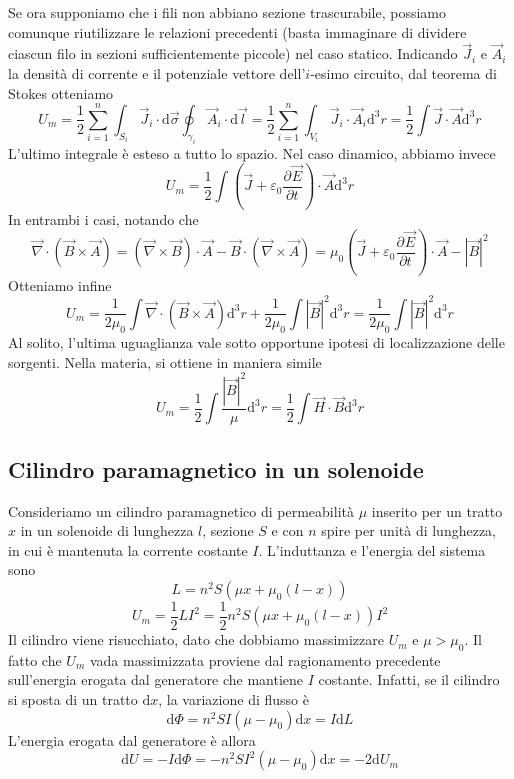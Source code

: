 \documentclass[a4paper,11pt]{book}
\let\oldnabla\nabla
\renewcommand{\nabla}{\vec{\oldnabla}}
\newcommand{\der}[3][]{\frac{\partial ^{#1}#2}{\partial #3^{#1}}}
\newcommand{\dif}{\mathrm{d}}
\let\oldepsilon\epsilon
\let\oldvarepsilon\varepsilon
\renewcommand{\epsilon}{\oldvarepsilon}
\renewcommand{\varepsilon}{\oldepsilon}
\theoremstyle{definition}
\theoremstyle{theorem}
\begin{document}
Se ora supponiamo che i fili non abbiano sezione trascurabile, possiamo comunque riutilizzare le relazioni precedenti (basta immaginare di dividere ciascun filo in sezioni sufficientemente piccole) nel caso statico. Indicando $\vec{J}_i$ e $\vec{A}_i$ la densità di corrente e il potenziale vettore dell'$i$-esimo circuito, dal teorema di Stokes otteniamo
\[U_m=\frac{1}{2}\sum_{i=1}^{n}\int_{S_i}\vec{J}_i\cdot\dif\vec{\sigma}\oint_{\gamma_i}\vec{A}_i\cdot\dif\vec{l}=\frac{1}{2}\sum_{i=1}^{n}\int_{V_i}\vec{J}_i\cdot\vec{A}_i\dif^3r=\frac{1}{2}\int\vec{J}\cdot\vec{A}\dif^3r\]
L'ultimo integrale è esteso a tutto lo spazio. Nel caso dinamico, abbiamo invece
\[U_m=\frac{1}{2}\int\left(\vec{J}+\epsilon_0\der{\vec{E}}{t}\right)\cdot\vec{A}\dif^3r\]
In entrambi i casi, notando che
\[\nabla\cdot(\vec{B}\times\vec{A})=(\nabla\times\vec{B})\cdot\vec{A}-\vec{B}\cdot(\nabla\times\vec{A})=\mu_0\left(\vec{J}+\epsilon_0\der{\vec{E}}{t}\right)\cdot\vec{A}-|\vec{B}|^2\]
Otteniamo infine
\[U_m=\frac{1}{2\mu_0}\int\nabla\cdot(\vec{B}\times\vec{A})\dif^3r+\frac{1}{2\mu_0}\int|\vec{B}|^2\dif^3r=\frac{1}{2\mu_0}\int|\vec{B}|^2\dif^3r\]
Al solito, l'ultima uguaglianza vale sotto opportune ipotesi di localizzazione delle sorgenti. Nella materia, si ottiene in maniera simile
\[U_m=\frac{1}{2}\int\frac{|\vec{B}|^2}{\mu}\dif^3r=\frac{1}{2}\int\vec{H}\cdot\vec{B}\dif^3r\]
\subsection{Cilindro paramagnetico in un solenoide}
Consideriamo un cilindro paramagnetico di permeabilità $\mu$ inserito per un tratto $x$ in un solenoide di lunghezza $l$, sezione $S$ e con $n$ spire per unità di lunghezza, in cui è mantenuta la corrente costante $I$. L'induttanza e l'energia del sistema sono
\[L=n^2S(\mu x+\mu_0(l-x))\]
\[U_m=\frac{1}{2}LI^2=\frac{1}{2}n^2S(\mu x+\mu_0(l-x))I^2\]
Il cilindro viene risucchiato, dato che dobbiamo massimizzare $U_m$ e $\mu>\mu_0$. Il fatto che $U_m$ vada massimizzata proviene dal ragionamento precedente sull'energia erogata dal generatore che mantiene $I$ costante. Infatti, se il cilindro si sposta di un tratto $\dif x$, la variazione di flusso è
\[\dif\Phi=n^2SI(\mu-\mu_0)\dif x=I\dif L\]
L'energia erogata dal generatore è allora
\[\dif U=-I\dif\Phi=-n^2SI^2(\mu-\mu_0)\dif x=-2\dif U_m\]
\end{document}
